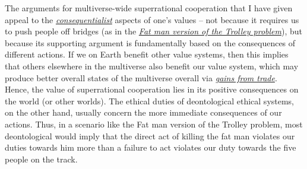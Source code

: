 The arguments for multiverse-wide superrational cooperation that I have
given appeal to the
\href{https://en.wikipedia.org/wiki/Consequentialism}{\emph{\emph{consequentialist}}}
aspects of one's values -- not because it requires us to push people off
bridges (as in the
\href{https://en.wikipedia.org/wiki/Trolley_problem\#The_fat_man}{\emph{Fat
man version of the Trolley problem}}), but because its supporting
argument is fundamentally based on the consequences of different
actions. If we on Earth benefit other value systems, then this implies
that others elsewhere in the multiverse also benefit our value system,
which may produce better overall states of the multiverse overall via
\href{https://foundational-research.org/gains-from-trade-through-compromise/}{\emph{gains
from trade}}. Hence, the value of superrational cooperation lies in its
positive consequences on the world (or other worlds). The ethical duties
of deontological ethical systems, on the other hand, usually concern the
more immediate consequences of our actions. Thus, in a scenario like the
Fat man version of the Trolley problem, most deontological would imply
that the direct act of killing the fat man violates our duties towards
him more than a failure to act violates our duty towards the five people
on the track.

